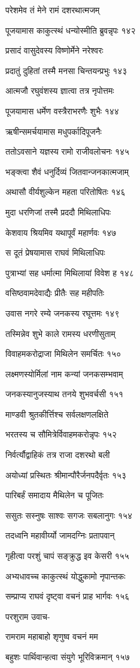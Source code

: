 परेशमेव तं मेने रामं दशरथात्मजम्

पूजयामास काकुत्स्थं धन्योस्मीति ब्रुवन्नृपः १४२

प्रसादं वासुदेवस्य विष्णोर्मेने नरेश्वरः

प्रदातुं दुहितां तस्मै मनसा चिन्तयन्प्रभुः १४३

आत्मजौ रघुवंशस्य ज्ञात्वा तत्र नृपोत्तमः

पूजयामास धर्मेण वस्त्रैराभरणैः शुभैः १४४

ऋषीन्समर्चयामास मधुपर्कादिपूजनैः

ततोऽवसाने यज्ञस्य रामो राजीवलोचनः १४५

भङ्क्त्वा शैवं धनुर्दिव्यं जितवान्जनकात्मजाम्

अथासौ वीर्यशुल्केन महता परितोषितः १४६

मुदा धरणिजां तस्मै प्रददौ मिथिलाधिपः

केशवाय श्रियमिव यथापूर्वं महार्णवः १४७

स दूतं प्रेषयामास राघवं मिथिलाधिपः

पुत्राभ्यां सह धर्मात्मा मिथिलायां विवेश ह १४८

वसिष्ठवामदेवाद्यैः प्रीतैः सह महीपतिः

उवास नगरे रम्ये जनकस्य रघूत्तमः १४९

तस्मिन्नेव शुभे काले रामस्य धरणीसुताम्

विवाहमकरोद्राजा मिथिलेन समर्चितः १५०

लक्ष्मणस्योर्मिलां नाम कन्यां जनकसम्भवाम्

जनकस्यानुजस्याथ तनये शुभवर्चसी १५१

माण्डवी श्रुतकीर्त्तिश्च सर्वलक्षणलक्षिते

भरतस्य च सौमित्रेर्विवाहमकरोन्नृपः १५२

निर्वर्त्यौद्वाहिकं तत्र राजा दशरथो बली

अयोध्यां प्रस्थितः श्रीमान्पौरैर्जनपदैर्वृतः १५३

पारिबर्हं समादाय मैथिलेन च पूजितः

ससुतः सस्नुषः साश्वः सगजः सबलानुगः १५४

तदध्वनि महावीर्य्यो जामदग्निः प्रतापवान्

गृहीत्वा परशुं चापं सङ्क्रुद्ध इव केसरी १५५

अभ्यधावच्च काकुत्स्थं योद्धुकामो नृपान्तकः

सम्प्राप्य राघवं दृष्ट्वा वचनं प्राह भार्गवः १५६

परशुराम उवाच-

रामराम महाबाहो शृणुष्व वचनं मम

बहुशः पार्थिवान्हत्वा संयुगे भूरिविक्रमान् १५७

